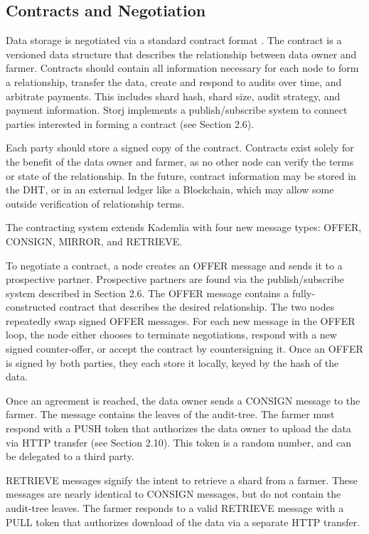 \documentclass[a4paper,10pt]{article}
\begin{document}
\subsection{Contracts and Negotiation}
Data storage is negotiated via a standard contract format \cite{7}. The contract is a versioned data structure that describes the relationship between data owner and farmer. Contracts should contain all information necessary for each node to form a relationship, transfer the data, create and respond to audits over time, and arbitrate payments. This includes shard hash, shard size, audit strategy, and payment information. Storj implements a publish/subscribe system to connect parties interested in forming a contract (see Section 2.6).

Each party should store a signed copy of the contract. Contracts exist solely for the benefit of the data owner and farmer, as no other node can verify the terms or state of the relationship. In the future, contract information may be stored in the DHT, or in an external ledger like a Blockchain, which may allow some outside verification of relationship terms.

The contracting system extends Kademlia with four new message types: OFFER, CONSIGN, MIRROR, and RETRIEVE.

To negotiate a contract, a node creates an OFFER message and sends it to a prospective partner. Prospective partners are found via the publish/subscribe system described in Section 2.6. The OFFER message contains a fully-constructed contract that describes the desired relationship. The two nodes repeatedly swap signed OFFER messages. For each new message in the OFFER loop, the node either chooses to terminate negotiations, respond with a new signed counter-offer, or accept the contract by countersigning it. Once an OFFER is signed by both parties, they each store it locally, keyed by the hash of the data.

Once an agreement is reached, the data owner sends a CONSIGN message to the farmer. The message contains the leaves of the audit-tree. The farmer must respond with a PUSH token that authorizes the data owner to upload the data via HTTP transfer (see Section 2.10). This token is a random number, and can be delegated to a third party.

RETRIEVE messages signify the intent to retrieve a shard from a farmer. These messages are nearly identical to CONSIGN messages, but do not contain the audit-tree leaves. The farmer responds to a valid RETRIEVE message with a PULL token that authorizes download of the data via a separate HTTP transfer.
\end{document}
